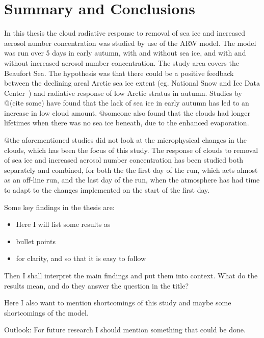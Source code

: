 \chapter{Summary and Conclusions}
\label{chap:summaryconclusions}
In this thesis the cloud radiative response to removal of sea ice and increased aerosol number concentration was studied by use of the ARW model. The model was run over 5 days in early autumn, with and without sea ice, and with and without increased aerosol number concentration. The study area covers the Beaufort Sea. The hypothesis was that there could be a positive feedback between the declining areal Arctic sea ice extent (eg. National Snow and Ice Data Center~\citep{NSIDC}) and radiative response of low Arctic stratus in autumn. Studies by @(cite some) have found that the lack of sea ice in early autumn has led to an increase in low cloud amount. @someone also found that the clouds had longer lifetimes when there was no sea ice beneath, due to the enhanced evaporation. 

@the aforementioned studies did not look at the microphysical changes in the clouds, which has been the focus of this study. The response of clouds to removal of sea ice and increased aerosol number concentration has been studied both separately and combined, for both the the first day of the run, which acts almost as an off-line run, and the last day of the run, when the atmosphere has had time to adapt to the changes implemented on the start of the first day.

Some key findings in the thesis are:
\begin{itemize}
\item Here I will list some results as 
\item bullet points
\item for clarity, and so that it is easy to follow
\end{itemize}

Then I shall interpret the main findings and put them into context. What do the results mean, and do they answer the question in the title? 

Here I also want to mention shortcomings of this study and maybe some shortcomings of the model.

Outlook: For future research I should mention something that could be done.



